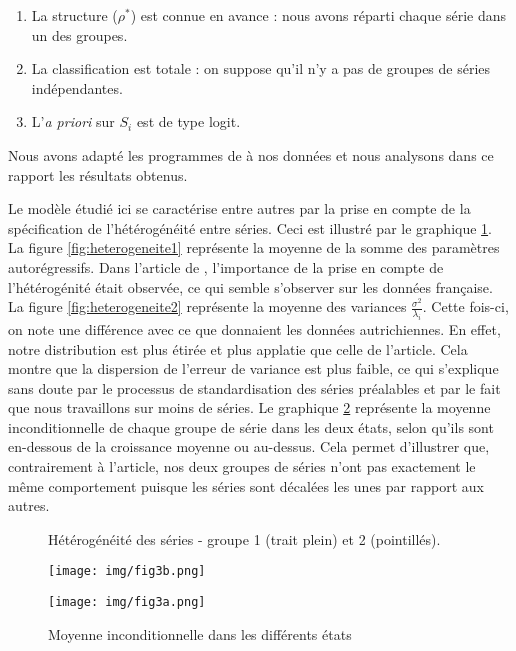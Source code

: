 \documentclass[10pt,french,french]{article}
\begin{document}
\begin{enumerate}
\def\labelenumi{\arabic{enumi}.}
\item
  La structure (\(\rho^*\)) est connue en avance : nous avons réparti chaque série dans un des groupes.
\item
  La classification est totale : on suppose qu'il n'y a pas de groupes de séries indépendantes.
\item
  L'\emph{a priori} sur \(S_i\) est de type logit.
\end{enumerate}

Nous avons adapté les programmes de \cite{Kaufmann} à nos données et nous analysons dans ce rapport les résultats obtenus.

Le modèle étudié ici se caractérise entre autres par la prise en compte de la spécification de l'hétérogénéité entre séries.
Ceci est illustré par le graphique \ref{heterogeneite}.
La figure \ref{fig:heterogeneite1} représente la moyenne de la somme des paramètres autorégressifs.
Dans l'article de \cite{Kaufmann}, l'importance de la prise en compte de l'hétérogénité était observée, ce qui semble s'observer sur les données française.
La figure \ref{fig:heterogeneite2} représente la moyenne des variances \(\frac{\sigma^2}{\lambda_i}\).
Cette fois-ci, on note une différence avec ce que donnaient les données autrichiennes.
En effet, notre distribution est plus étirée et plus applatie que celle de l'article.
Cela montre que la dispersion de l'erreur de variance est plus faible, ce qui s'explique sans doute par le processus de standardisation des séries préalables et par le fait que nous travaillons sur moins de séries.
Le graphique \ref{etats} représente la moyenne inconditionnelle de chaque groupe de série dans les deux états, selon qu'ils sont en-dessous de la croissance moyenne ou au-dessus.
Cela permet d'illustrer que, contrairement à l'article, nos deux groupes de séries n'ont pas exactement le même comportement puisque les séries sont décalées les unes par rapport aux autres.

\begin{figure}
\caption{Hétérogénéité des séries - groupe 1 (trait plein) et 2 (pointillés).}
\label{heterogeneite}
\end{figure}

\begin{figure}
\begin{minipage}{.5\textwidth}
\texttt{[image: img/fig3b.png]}
\end{minipage}
\hfill
\begin{minipage}{.5\textwidth}
\texttt{[image: img/fig3a.png]}
\end{minipage}
\caption{Moyenne inconditionnelle dans les différents états}
\label{etats}
\end{figure}
\end{document}

